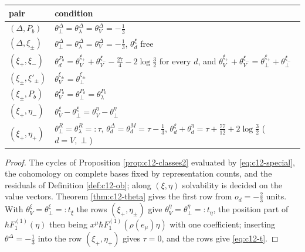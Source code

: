 \begin{tabular}{l|l}
pair & condition\\
\hline
$(\Delta,P_b)$ & $\theta^\Delta_\perp=\theta^\Delta_\lambda=\theta^\Delta_V=-\tfrac13$\\
$(\Delta,\xi_\pm)$ & $\theta^\Delta_\perp=\theta^\Delta_\lambda=\theta^\Delta_V=-\tfrac13$, $\theta^\xi_d$ free\\
$(\xi_+,\xi_-)$ & $\theta^{P_b}_d=\theta^{\xi_+}_V+\theta^{\xi_-}_V-\tfrac{27}4-2\log\tfrac32$ for every $d$, and $\theta^{\xi_+}_V+\theta^{\xi_-}_V=\theta^{\xi_+}_\perp+\theta^{\xi_-}_\perp$\\
$(\xi_\pm,\xi'_\pm)$ & $\theta^{\xi_\pm}_V=\theta^{\xi_\pm}_\perp$\\
$(\xi_\pm,P_b)$ & $\theta^{P_b}_V=\theta^{P_b}_\perp=\theta^{P_b}_\lambda$\\
$(\xi_+,\eta_-)$ & $\theta^\xi_V-\theta^\xi_\perp=\theta^\eta_V-\theta^\eta_\perp$\\
$(\xi_+,\eta_+)$ & $\theta^R_\perp=\theta^R_\lambda=:\tau$, $\theta^\Delta_d=\theta^M_d=\tau-\tfrac13$, $\theta^\xi_d+\theta^\eta_d=\tau+\tfrac{77}{12}+2\log\tfrac32$ ($d=V,\perp$)\\
\end{tabular}

\begin{proof}
The cycles of Proposition \ref{prop:c12-classes2} evaluated by \eqref{eq:c12-special}, the cohomology on complete bases fixed by representation counts, and the residuals of Definition \ref{def:c12-ob}; along $(\xi,\eta)$ solvability is decided on the value vectors. Theorem \ref{thm:c12-theta} gives the first row from $o_d=-\tfrac23$ units. With $\theta^\xi_V=\theta^\xi_\perp=:t_\xi$ the rows $(\xi_+,\eta_\pm)$ give $\theta^\eta_V=\theta^\eta_\perp=:t_\eta$, the position part of $\hbar F_1^{(1)}(\eta)$ then being $x^\mu\hbar F_1^{(1)}(\rho(e_\mu)\eta)$ with one coefficient; inserting $\theta^\Delta=-\tfrac13$ into the row $(\xi_+,\eta_+)$ gives $\tau=0$, and the rows give \eqref{eq:c12-t}.
\end{proof}

